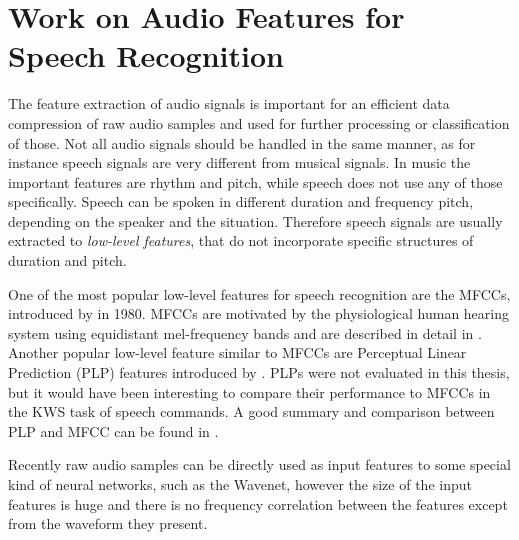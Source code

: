 
\section{Work on Audio Features for Speech Recognition}\label{sec:prev_features}
The feature extraction of audio signals is important for an efficient data compression of raw audio samples and used for further processing or classification of those.
Not all audio signals should be handled in the same manner, as for instance speech signals are very different from musical signals.
In music the important features are rhythm and pitch, while speech does not use any of those specifically.
Speech can be spoken in different duration and frequency pitch, depending on the speaker and the situation.
Therefore speech signals are usually extracted to \emph{low-level features}, that do not incorporate specific structures of duration and pitch.

One of the most popular low-level features for speech recognition are the MFCCs, introduced by \cite{Mermelstein1980} in 1980.
MFCCs are motivated by the physiological human hearing system using equidistant mel-frequency bands and are described in detail in .
Another popular low-level feature similar to MFCCs are Perceptual Linear Prediction (PLP) features introduced by \cite{Hermansky1987}.
PLPs were not evaluated in this thesis, but it would have been interesting to compare their performance to MFCCs in the KWS task of speech commands.
A good summary and comparison between PLP and MFCC can be found in \cite{Hoenig2005}.

Recently raw audio samples can be directly used as input features to some special kind of neural networks, such as the Wavenet, however the size of the input features is huge and there is no frequency correlation between the features except from the waveform they present.